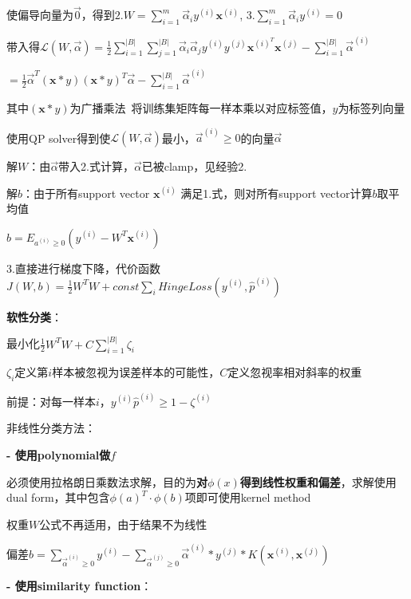 \documentclass[UTF8]{ctexart}
\begin{document}
  \quad \quad \quad 使偏导向量为$\vec{0} $，得到$2.W = \sum_{i=1}^{m}\vec{\alpha}_iy^{(i)}\textbf{x}^{(i)}$, $3.\sum_{i=1}^{m}\vec{\alpha}_iy^{(i)}=0$

  \quad \quad \quad 带入得$\mathcal{L} (W, \vec{\alpha}) = \frac{1}{2}\sum_{i=1}^{|B|}\sum_{j=1}^{|B|}\vec{\alpha}_i\vec{\alpha}_jy^{(i)}y^{(j)}\textbf{x}^{(i)^T}\textbf{x}^{(j)} - \sum_{i=1}^{|B|}\vec{\alpha}^{(i)}$
  
  \quad \quad \quad \quad $=\frac{1}{2}\vec{\alpha}^T (\textbf{x} * y)(\textbf{x} * y)^T \vec{\alpha} - \sum_{i=1}^{|B|}\vec{\alpha}^{(i)}$

  \quad \quad \quad \quad 其中$(\textbf{x} * y)$为广播乘法\ 将训练集矩阵每一样本乘以对应标签值，$y$为标签列向量

  \quad \quad \quad 使用QP solver得到使$\mathcal{L} (W, \vec{\alpha})$最小，$\vec{a}^{(i)} \geq 0$的向量$\vec{\alpha}$

  \quad \quad \quad 解$W$：由$\vec{\alpha}$带入2.式计算，$\vec{\alpha}$已被clamp，见经验2.

  \quad \quad \quad 解$b$：由于所有support vector $\textbf{x}^{(i)}$ 满足1.式，则对所有support vector计算$b$取平均值

  \quad \quad \quad \quad $b = E_{a^{(i)} \geq 0}(y^{(i)}-W^T\textbf{x}^{(i)})$

  \quad \quad 3.直接进行梯度下降，代价函数$J(W, b) = \frac{1}{2}W^TW + const \sum_i HingeLoss(y^{(i)}, \hat{p}^{(i)})$
  
  \quad \textbf{软性分类}：

  \quad \quad 最小化$\frac{1}{2}W^TW + C\sum_{i=1}^{|B|}\zeta_i $

  \quad \quad \quad $\zeta_i$定义第$i$样本被忽视为误差样本的可能性，$C$定义忽视率相对斜率的权重

  \quad \quad 前提：对每一样本$i$，$y^{(i)}\hat{p}^{(i)} \geq 1 - \zeta^{(i)}$

  非线性分类方法：

  \textbf{- 使用polynomial做$f$}

  \quad 必须使用拉格朗日乘数法求解，目的为\textbf{对$\phi(x)$得到线性权重和偏差}，求解使用dual form，其中包含$\phi(a)^T \cdot \phi(b)$项即可使用kernel method

  \quad 权重$W$公式不再适用，由于结果不为线性

  \quad 偏差$b = \sum_{\vec{\alpha}^{(i)} \geq 0} y^{(i)} - \sum_{\vec{\alpha}^{(j)} \geq 0} \vec{\alpha}^{(i)} * y^{(j)} * K(\textbf{x}^{(i)}, \textbf{x}^{(j)})$

  \textbf{- 使用similarity function}：
  
\end{document}
